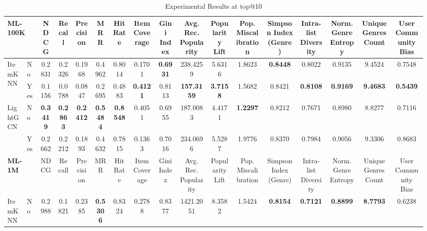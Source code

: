 \documentclass{article}
\begin{document}
\begin{table}[htbp]
\centering
\caption{Experimental Results at top@10}
\begin{adjustbox}{width=\textwidth,center}
\begin{tabular}{llccccccccccccccc}
\toprule
\multicolumn{2}{l}{\textbf{ML-100K}} & NDCG & Recall & Precision & MRR & Hit Rate & Item Coverage & Gini Index & Avg. Rec. Popularity & Popularity Lift & Pop. Miscalibration & Simpson Index (Genre) & Intra-list Diversity & Norm. Genre Entropy & Unique Genres Count & User Community Bias \\
\midrule
\multirow{2}{*}{ItemKNN} & No & 0.2831 & 0.2326 & 0.1968 & 0.4962 & 0.8014 & 0.1701 & \textbf{0.6931} & 238.4259 & 5.6316 & 1.8623 & \textbf{0.8448} & 0.8022 & 0.9135 & 9.4524 & 0.7548 \\
 & Yes & \cellcolor{red!40} 0.1156 & \cellcolor{red!40} 0.0788 & \cellcolor{red!40} 0.0847 & \cellcolor{red!40} 0.2695 & \cellcolor{red!40} 0.4883 & \textbf{\cellcolor{green!40} 0.4121} & \cellcolor{red!40} 0.8113 & \textbf{\cellcolor{green!40} 157.3159} & \textbf{\cellcolor{green!40} 3.7158} & \cellcolor{green!40} 1.5682 & \cellcolor{red!20} 0.8421 & \textbf{\cellcolor{green!20} 0.8108} & \textbf{\cellcolor{green!20} 0.9169} & \textbf{\cellcolor{green!20} 9.4683} & \textbf{\cellcolor{green!40} 0.5439} \\
\cmidrule{1-17}
\multirow{2}{*}{LightGCN} & No & \textbf{0.3419} & \textbf{0.2863} & \textbf{0.2412} & \textbf{0.5484} & \textbf{0.8548} & 0.4051 & 0.6955 & 187.0083 & 4.4171 & \textbf{1.2297} & 0.8212 & 0.7671 & 0.8980 & 8.8277 & 0.7116 \\
 & Yes & \cellcolor{red!40} 0.2662 & \cellcolor{red!40} 0.2212 & \cellcolor{red!40} 0.1893 & \cellcolor{red!40} 0.4632 & \cellcolor{red!40} 0.7815 & \cellcolor{red!40} 0.1363 & \cellcolor{red!20} 0.7016 & \cellcolor{red!40} 234.0696 & \cellcolor{red!40} 5.5287 & \cellcolor{red!40} 1.9776 & \cellcolor{green!20} 0.8370 & \cellcolor{green!20} 0.7984 & \cellcolor{green!20} 0.9056 & \cellcolor{green!40} 9.3306 & \cellcolor{red!40} 0.8683 \\
\midrule\midrule
\multicolumn{2}{l}{\textbf{ML-1M}} & NDCG & Recall & Precision & MRR & Hit Rate & Item Coverage & Gini Index & Avg. Rec. Popularity & Popularity Lift & Pop. Miscalibration & Simpson Index (Genre) & Intra-list Diversity & Norm. Genre Entropy & Unique Genres Count & User Community Bias \\
\midrule
\multirow{2}{*}{ItemKNN} & No & 0.2988 & 0.1821 & 0.2385 & \textbf{0.5306} & 0.8324 & 0.2788 & 0.8377 & 1421.2051 & 8.3582 & 1.5424 & \textbf{0.8154} & \textbf{0.7121} & \textbf{0.8899} & \textbf{8.7793} & 0.6238 \\

\end{tabular}
\end{adjustbox}
\end{table}
\end{document}
